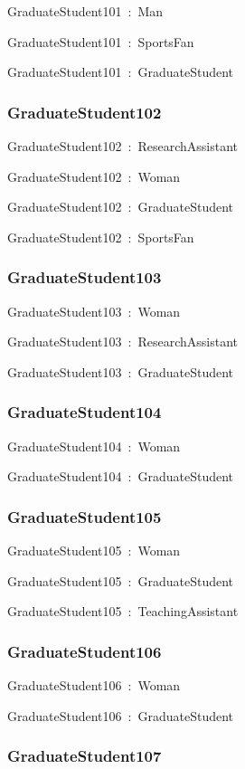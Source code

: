 \documentclass{article}
\begin{document}
GraduateStudent101~:~Man

GraduateStudent101~:~SportsFan

GraduateStudent101~:~GraduateStudent

\subsubsection*{GraduateStudent102}

GraduateStudent102~:~ResearchAssistant

GraduateStudent102~:~Woman

GraduateStudent102~:~GraduateStudent

GraduateStudent102~:~SportsFan

\subsubsection*{GraduateStudent103}

GraduateStudent103~:~Woman

GraduateStudent103~:~ResearchAssistant

GraduateStudent103~:~GraduateStudent

\subsubsection*{GraduateStudent104}

GraduateStudent104~:~Woman

GraduateStudent104~:~GraduateStudent

\subsubsection*{GraduateStudent105}

GraduateStudent105~:~Woman

GraduateStudent105~:~GraduateStudent

GraduateStudent105~:~TeachingAssistant

\subsubsection*{GraduateStudent106}

GraduateStudent106~:~Woman

GraduateStudent106~:~GraduateStudent

\subsubsection*{GraduateStudent107}
\end{document}
